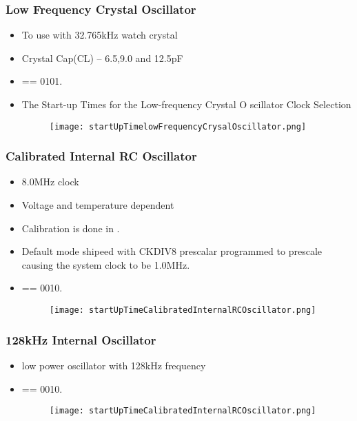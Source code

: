 \documentclass{article}
\begin{document}
\subsubsection{Low Frequency Crystal Oscillator}
\begin{itemize}
    \item To use with 32.765kHz watch crystal
    \item Crystal Cap(CL) – 6.5,9.0 and 12.5pF
    \item {} == 0101.
    \item The Start-up Times for the Low-frequency Crystal O scillator Clock Selection
    \begin{figure}[H]
        \begin{center}
            \texttt{[image: startUpTimelowFrequencyCrysalOscillator.png]}
        \end{center}
    \end{figure}
\end{itemize}

\subsubsection{Calibrated Internal RC Oscillator}
\begin{itemize}
    \item 8.0MHz clock
    \item Voltage and temperature dependent
    \item Calibration is done in .
    \item Default mode shipeed with CKDIV8 prescalar programmed to prescale causing the system clock to be 1.0MHz.
    \item {} == 0010.
    \begin{figure}[H]
        \begin{center}
            \texttt{[image: startUpTimeCalibratedInternalRCOscillator.png]}
        \end{center}
    \end{figure}
\end{itemize}

\subsubsection{128kHz Internal Oscillator}
\begin{itemize}
    \item low power oscillator with 128kHz frequency
    \item {} == 0010.
    \begin{figure}[H]
        \begin{center}
            \texttt{[image: startUpTimeCalibratedInternalRCOscillator.png]}
        \end{center}
    \end{figure}
\end{itemize}
\end{document}
